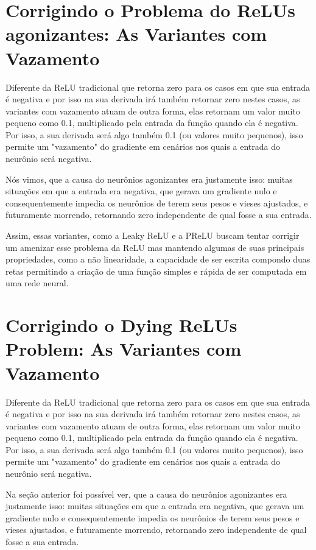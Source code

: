 \section{Corrigindo o Problema do ReLUs agonizantes: As Variantes com Vazamento}

Diferente da ReLU tradicional que retorna zero para os casos em que sua entrada é negativa e por isso na sua derivada irá também retornar zero nestes casos, as variantes com vazamento atuam de outra forma, elas retornam um valor muito pequeno como 0.1, multiplicado pela entrada da função quando ela é negativa. Por isso, a sua derivada será algo também 0.1 (ou valores muito pequenos), isso permite um "vazamento" do gradiente em cenários nos quais a entrada do neurônio será negativa.

Nós vimos, que a causa do neurônios agonizantes era justamente isso: muitas situações em que a entrada era negativa, que gerava um gradiente nulo e consequentemente impedia os neurônios de terem seus pesos e vieses ajustados, e futuramente morrendo, retornando zero independente de qual fosse a sua entrada.

Assim, essas variantes, como a Leaky ReLU e a PReLU buscam tentar corrigir um amenizar esse problema da ReLU mas mantendo algumas de suas principais propriedades, como a não linearidade, a capacidade de ser escrita compondo duas retas permitindo a criação de uma função simples e rápida de ser computada em uma rede neural.

\section{Corrigindo o Dying ReLUs Problem: As Variantes com Vazamento}

Diferente da ReLU tradicional que retorna zero para os casos em que sua entrada é negativa e por isso na sua derivada irá também retornar zero nestes casos, as variantes com vazamento atuam de outra forma, elas retornam um valor muito pequeno como 0.1, multiplicado pela entrada da função quando ela é negativa. Por isso, a sua derivada será algo também 0.1 (ou valores muito pequenos), isso permite um "vazamento" do gradiente em cenários nos quais a entrada do neurônio será negativa.

Na seção anterior foi possível ver, que a causa do neurônios agonizantes era justamente isso: muitas situações em que a entrada era negativa, que gerava um gradiente nulo e consequentemente impedia os neurônios de terem seus pesos e vieses ajustados, e futuramente morrendo, retornando zero independente de qual fosse a sua entrada.

